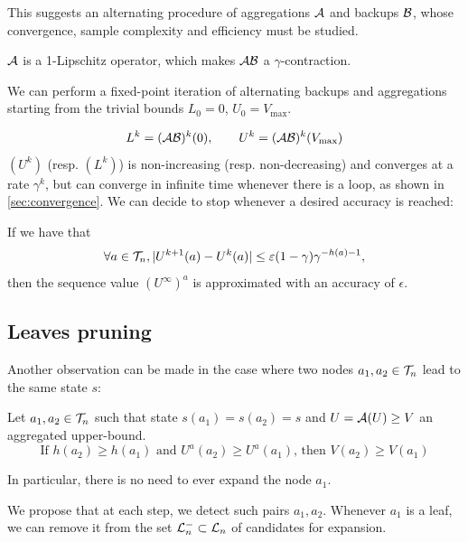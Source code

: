 \documentclass{article}
\begin{document}
This suggests an alternating procedure of aggregations $\mathcal{A}$ and backups $\mathcal{B}$, whose convergence, sample complexity and efficiency must be studied.

\begin{proposition}[Contractivity of $\cA\cB$]
\label{prop:contractivity}
$\mathcal{A}$ is a 1-Lipschitz operator, which makes $\cA\cB$ a $\gamma$-contraction.
\end{proposition}

We can perform a fixed-point iteration of alternating backups and aggregations starting from the trivial bounds $L_0=0$, $U_0 = V_{\max}$.

\begin{equation}
    \label{eq:recursion}
    L^k = (\mathcal{A} \mathcal{B})^k(0), \qquad
    U^k = (\mathcal{A} \mathcal{B})^k(V_{\max})
\end{equation}
$(U^k)$ (resp. $(L^k)$) is non-increasing (resp. non-decreasing) and converges at a rate $\gamma^k$, but can converge in infinite time whenever there is a loop, as shown in \autoref{sec:convergence}. We can decide to stop whenever a desired accuracy is reached: 

\begin{proposition}
\label{prop:early-stopping}
If we have that
\[\forall a\in\mathcal{T}_n, |U^{k+1}(a) - U^k(a)| \leq \varepsilon (1-\gamma)\gamma^{-h(a)-1},\]
then the sequence value $(U^{\infty})^a$ is approximated with an accuracy of $\epsilon$.
\end{proposition}

\subsection{Leaves pruning}
\label{sec:pruning}

Another observation can be made in the case where two nodes $a_1,a_2\in\mathcal{T}_n$ lead to the same state $s$:
\begin{proposition}
\label{prop:pruning}
Let $a_1,a_2\in\mathcal{T}_n$ such that state $s(a_1) = s(a_2) = s$ and $U = \mathcal{A}(U) \geq V$ an aggregated upper-bound. 
\begin{equation}
\label{eq:pruning}
    \text{If } h(a_2) \geq h(a_1) \text{ and } U^a(a_2) \geq U^a(a_1)
    \text{, then }V(a_2) \geq V(a_1)
\end{equation}

In particular, there is no need to ever expand the node $a_1$.
\end{proposition}

We propose that at each step, we detect such pairs $a_1, a_2$. Whenever $a_1$ is a leaf, we can remove it from the set $\mathcal{L}_n^-\subset \mathcal{L}_n $ of candidates for expansion.
\end{document}
